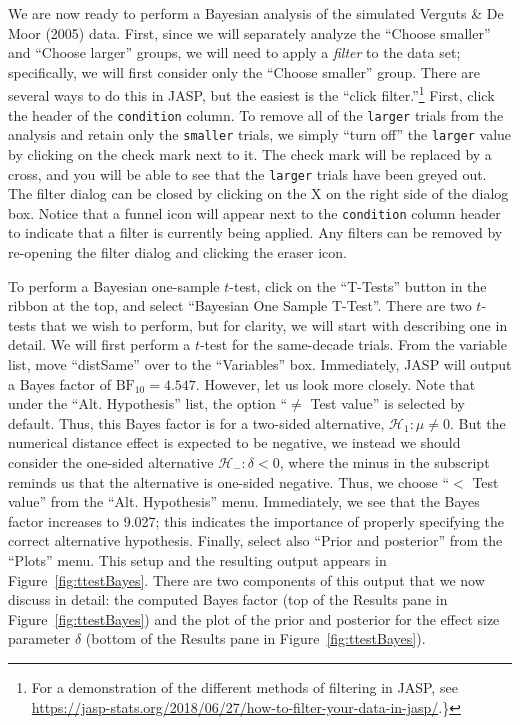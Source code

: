 \documentclass[english,,doc,floatsintext]{apa6}
\let\rmarkdownfootnote\footnote%
\def\footnote{\protect\rmarkdownfootnote}
\begin{document}
We are now ready to perform a Bayesian analysis of the simulated Verguts \& De Moor (2005) data. First, since we will separately analyze the \enquote{Choose smaller} and \enquote{Choose larger} groups, we will need to apply a \emph{filter} to the data set; specifically, we will first consider only the \enquote{Choose smaller} group. There are several ways to do this in JASP, but the easiest is the \enquote{click filter.}\footnote{For a demonstration of the different methods of filtering in JASP, see \url{https://jasp-stats.org/2018/06/27/how-to-filter-your-data-in-jasp/}.\}} First, click the header of the \texttt{condition} column. To remove all of the \texttt{larger} trials from the analysis and retain only the \texttt{smaller} trials, we simply \enquote{turn off} the \texttt{larger} value by clicking on the check mark next to it. The check mark will be replaced by a cross, and you will be able to see that the \texttt{larger} trials have been greyed out. The filter dialog can be closed by clicking on the X on the right side of the dialog box. Notice that a funnel icon will appear next to the \texttt{condition} column header to indicate that a filter is currently being applied. Any filters can be removed by re-opening the filter dialog and clicking the eraser icon.

To perform a Bayesian one-sample \(t\)-test, click on the \enquote{T-Tests} button in the ribbon at the top, and select \enquote{Bayesian One Sample T-Test}. There are two \(t\)-tests that we wish to perform, but for clarity, we will start with describing one in detail. We will first perform a \(t\)-test for the same-decade trials. From the variable list, move \enquote{distSame} over to the \enquote{Variables} box. Immediately, JASP will output a Bayes factor of \(\text{BF}_{10}=4.547\). However, let us look more closely. Note that under the \enquote{Alt. Hypothesis} list, the option \enquote{\(\neq\) Test value} is selected by default. Thus, this Bayes factor is for a two-sided alternative, \(\mathcal{H}_1:\mu \neq 0\). But the numerical distance effect is expected to be negative, we instead we should consider the one-sided alternative \(\mathcal{H}_{-}:\delta < 0\), where the minus in the subscript reminds us that the alternative is one-sided negative. Thus, we choose \enquote{\(<\) Test value} from the \enquote{Alt. Hypothesis} menu. Immediately, we see that the Bayes factor increases to 9.027; this indicates the importance of properly specifying the correct alternative hypothesis. Finally, select also \enquote{Prior and posterior} from the \enquote{Plots} menu. This setup and the resulting output appears in Figure~\ref{fig:ttestBayes}. There are two components of this output that we now discuss in detail: the computed Bayes factor (top of the Results pane in Figure~\ref{fig:ttestBayes}) and the plot of the prior and posterior for the effect size parameter \(\delta\) (bottom of the Results pane in Figure~\ref{fig:ttestBayes}).
\end{document}
